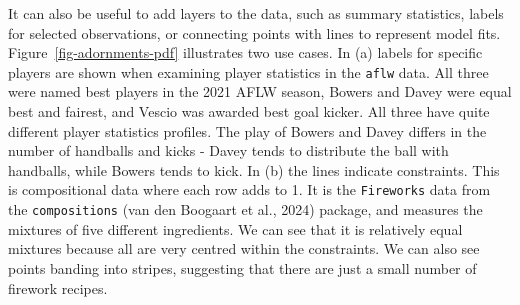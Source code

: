 \documentclass[
  letterpaper,
]{krantz}
\begin{document}
It can also be useful to add layers to the data, such as summary
statistics, labels for selected observations, or connecting points with
lines to represent model fits. Figure~\ref{fig-adornments-pdf}
illustrates two use cases. In (a) labels for specific players are shown
when examining player statistics in the \texttt{aflw} data. All three
were named best players in the 2021 AFLW season, Bowers and Davey were
equal best and fairest, and Vescio was awarded best goal kicker. All
three have quite different player statistics profiles. The play of
Bowers and Davey differs in the number of handballs and kicks - Davey
tends to distribute the ball with handballs, while Bowers tends to kick.
In (b) the lines indicate constraints. This is compositional data where
each row adds to 1. It is the \texttt{Fireworks} data from the
\texttt{compositions} (van den Boogaart et al., 2024) package, and
measures the mixtures of five different ingredients. We can see that it
is relatively equal mixtures because all are very centred within the
constraints. We can also see points banding into stripes, suggesting
that there are just a small number of firework recipes.

 
\end{document}
